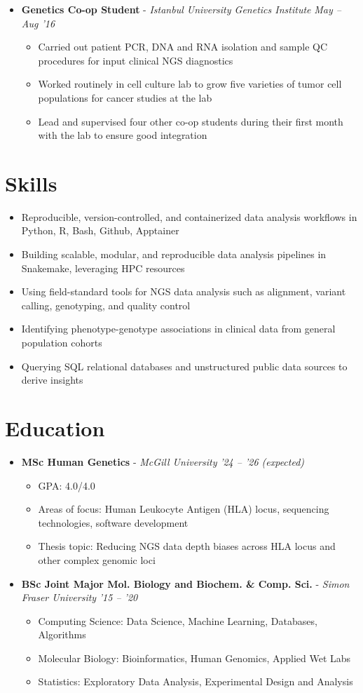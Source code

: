 \documentclass{article}
\newcommand{\experienceheader}[3]{\item \textbf{#1} - \textit{#2} \hfill \textit{#3} \vspace{-.2em}}
\newcommand{\customsection}[1]{\section*{#1} \vspace{-1em} \hrulefill \vspace{-.5em}}
\begin{document}
\begin{itemize}
  \experienceheader{Genetics Co-op Student}{Istanbul University Genetics Institute}{May -- Aug '16}
    \begin{itemize}
      \item Carried out patient PCR, DNA and RNA isolation and sample QC procedures for input clinical NGS diagnostics
      \item Worked routinely in cell culture lab to grow five varieties of tumor cell populations for cancer studies at the lab
      \item Lead and supervised four other co-op students during their first month with the lab to ensure good integration
    \end{itemize}
\end{itemize}


\customsection{Skills}
\begin{itemize}
  \item Reproducible, version-controlled, and containerized data analysis workflows in Python, R, Bash, Github, Apptainer
  \item Building scalable, modular, and reproducible data analysis pipelines in Snakemake, leveraging HPC resources
  \item Using field-standard tools for NGS data analysis such as alignment, variant calling, genotyping, and quality control
  \item Identifying phenotype-genotype associations in clinical data from general population cohorts
  \item Querying SQL relational databases and unstructured public data sources to derive insights
\end{itemize}


\customsection{Education}
\begin{itemize}
\experienceheader{MSc Human Genetics}{McGill University}{'24 -- '26 (expected)}
  \begin{itemize}
    \item GPA: 4.0/4.0
    \item Areas of focus: Human Leukocyte Antigen (HLA) locus, sequencing technologies, software development
    \item Thesis topic: Reducing NGS data depth biases across HLA locus and other complex genomic loci
  \end{itemize}
\experienceheader{BSc Joint Major Mol. Biology and Biochem. \& Comp. Sci.}{Simon Fraser University}{'15 -- '20}
  \begin{itemize}
    \item Computing Science: Data Science, Machine Learning, Databases, Algorithms
    \item Molecular Biology: Bioinformatics, Human Genomics, Applied Wet Labs
    \item Statistics: Exploratory Data Analysis, Experimental Design and Analysis
  \end{itemize}
\end{itemize}
\end{document}

